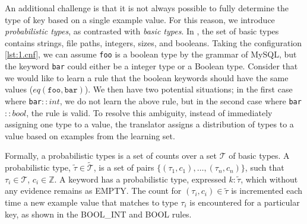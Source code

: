 An additional challenge is that it is not always possible to fully determine the type of key based on a single example value. 
For this reason, we introduce \textit{probabilistic types}, as contrasted with \textit{basic types}.
In \app, the set of basic types contains strings, file paths, integers, sizes, and booleans. 
Taking the configuration \ref{lst:1.cnf}, we can assume {\tt foo} is a boolean type by the grammar of MySQL,
  but the keyword {\tt bar} could either be a integer type or a Boolean type.
Consider that we would like to learn a rule that the boolean keywords should have the same values ($eq(\texttt{foo},\texttt{bar})$).
We then have two potential situations; in the first case where {\tt bar}$::int$, we do not learn the above rule, but in the second case where {\tt bar}$::bool$, the rule is valid.
To resolve this ambiguity, instead of immediately assigning one type to a value, the translator assigns a distribution of types to a value based on examples from the learning set.

Formally, a probabilistic types is a set of counts over a set $\mathcal{T}$ of basic types.
A probabilistic type, $\tilde{\tau} \in \tilde{\mathcal{T}}$, is a set of pairs $\{(\tau_1, c_1),\ldots,(\tau_n, c_n)\}$, such that $\tau_i \in \mathcal{T}$, $c_i \in \mathbb{Z}$. 
A keyword has a probabilistic type, expressed $k:\tilde{\tau}$, which without any evidence remains as {\scriptsize EMPTY}.
The count for $(\tau_i,c_i) \in \tilde{\tau}$ is incremented each time a new example value that matches to type $\tau_i$ is encountered for a particular key, as shown in the {\scriptsize BOOL\_INT} and {\scriptsize BOOL} rules.


